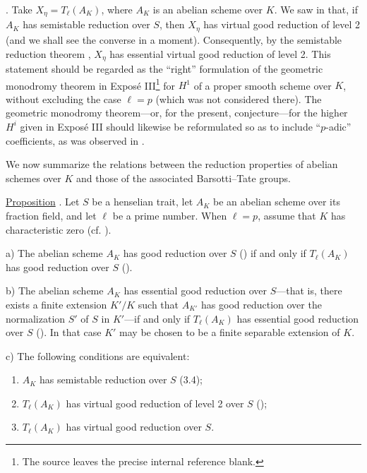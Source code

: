 \medskip
\noindent
{}. Take $X_\eta=T_\ell(A_K)$, where $A_K$ is an abelian scheme
over $K$. We saw in  that, if $A_K$ has semistable reduction over
$S$, then $X_\eta$ has virtual good reduction of level 2 (and we shall
see the converse in a moment). Consequently, by the semistable
reduction theorem , $X_\eta$ has essential virtual good reduction of
level 2. This statement should be regarded as the ``right'' formulation
of the geometric monodromy theorem in Expos\'e III\footnote{The source
leaves the precise internal reference blank.} for $H^1$ of a proper
smooth scheme over $K$, without excluding the case $\ell=p$ (which was
not considered there). The geometric monodromy theorem---or, for the
present, conjecture---for the higher $H^i$ given in Expos\'e III should
likewise be reformulated so as to include ``$p$-adic'' coefficients, as
was observed in .

We now summarize the relations between the reduction properties of
abelian schemes over $K$ and those of the associated Barsotti--Tate
groups.

\medskip
\noindent
\underline{Proposition} . Let $S$ be a henselian trait, let $A_K$
be an abelian scheme over its fraction field, and let $\ell$ be a prime
number. When $\ell=p$, assume that $K$ has characteristic zero
(cf. ).

\smallskip
\noindent
a) The abelian scheme $A_K$ has good reduction over $S$ () if and
only if $T_\ell(A_K)$ has good reduction over $S$ ().

\smallskip
\noindent
b) The abelian scheme $A_K$ has essential good reduction over $S$---that
is, there exists a finite extension $K'/K$ such that $A_{K'}$ has good
reduction over the normalization $S'$ of $S$ in $K'$---if and only if
$T_\ell(A_K)$ has essential good reduction over $S$ (). In that
case $K'$ may be chosen to be a finite separable extension of $K$.

\smallskip
\noindent
c) The following conditions are equivalent:
\begin{enumerate}
\item[1)] $A_K$ has semistable reduction over $S$ (3.4);
\item[2)] $T_\ell(A_K)$ has virtual good reduction of level 2 over $S$
  ();
\item[3)] $T_\ell(A_K)$ has virtual good reduction over $S$.
\end{enumerate}

